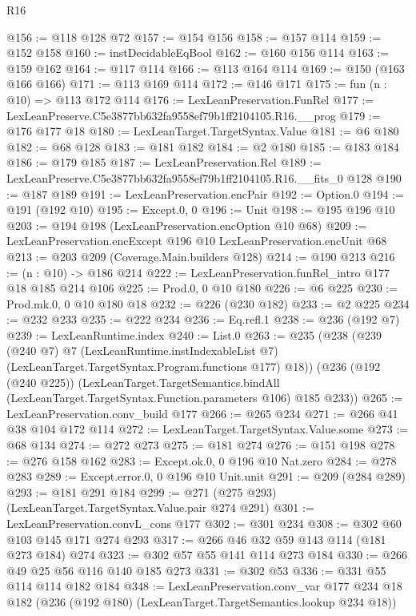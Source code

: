 \begin{lexlean}{R16}
\begin{coremodule}
@156 := @118 @128 @72
@157 := @154 @156
@158 := @157 @114
@159 := @152 @158
@160 := instDecidableEqBool
@162 := @160 @156 @114
@163 := @159 @162
@164 := @117 @114
@166 := @113 @164 @114
@169 := @150 (@163 @166 @166)
@171 := @113 @169 @114
@172 := @146 @171
@175 := fun (n : @10) => @113 @172 @114
@176 := LexLeanPreservation.FunRel
@177 := LexLeanPreserve.C5e3877bb632fa9558ef79b1ff2104105.R16.__prog
@179 := @176 @177 @18
@180 := LexLeanTarget.TargetSyntax.Value
@181 := @6 @180
@182 := @68 @128
@183 := @181 @182
@184 := @2 @180
@185 := @183 @184
@186 := @179 @185
@187 := LexLeanPreservation.Rel
@189 := LexLeanPreserve.C5e3877bb632fa9558ef79b1ff2104105.R16.__fits_0 @128
@190 := @187 @189
@191 := LexLeanPreservation.encPair
@192 := Option.{0}
@194 := @191 (@192 @10)
@195 := Except.{0, 0}
@196 := Unit
@198 := @195 @196 @10
@203 := @194 @198 (LexLeanPreservation.encOption @10 @68)
@209 := LexLeanPreservation.encExcept @196 @10 LexLeanPreservation.encUnit @68
@213 := @203 @209 (Coverage.Main.builders @128)
@214 := @190 @213
@216 := (n : @10) -> @186 @214
@222 := LexLeanPreservation.funRel_intro @177 @18 @185 @214 @106
@225 := Prod.{0, 0} @10 @180
@226 := @6 @225
@230 := Prod.mk.{0, 0} @10 @180 @18
@232 := @226 (@230 @182)
@233 := @2 @225
@234 := @232 @233
@235 := @222 @234
@236 := Eq.refl.{1}
@238 := @236 (@192 @7)
@239 := LexLeanRuntime.index
@240 := List.{0}
@263 := @235
    (@238
      (@239
        (@240 @7)
        @7
        (LexLeanRuntime.instIndexableList @7)
        (LexLeanTarget.TargetSyntax.Program.functions @177)
        @18))
    (@236
      (@192 (@240 @225))
      (LexLeanTarget.TargetSemantics.bindAll
        (LexLeanTarget.TargetSyntax.Function.parameters @106)
        @185
        @233))
@265 := LexLeanPreservation.conv_build @177
@266 := @265 @234
@271 := @266 @41 @38 @104 @172 @114
@272 := LexLeanTarget.TargetSyntax.Value.some
@273 := @68 @134
@274 := @272 @273
@275 := @181 @274
@276 := @151 @198
@278 := @276 @158 @162
@283 := Except.ok.{0, 0} @196 @10 Nat.zero
@284 := @278 @283
@289 := Except.error.{0, 0} @196 @10 Unit.unit
@291 := @209 (@284 @289)
@293 := @181 @291 @184
@299 := @271 (@275 @293) (LexLeanTarget.TargetSyntax.Value.pair @274 @291)
@301 := LexLeanPreservation.convL_cons @177
@302 := @301 @234
@308 := @302 @60 @103 @145 @171 @274 @293
@317 := @266 @46 @32 @59 @143 @114 (@181 @273 @184) @274
@323 := @302 @57 @55 @141 @114 @273 @184
@330 := @266 @49 @25 @56 @116 @140 @185 @273
@331 := @302 @53
@336 := @331 @55 @114 @114 @182 @184
@348 := LexLeanPreservation.conv_var
    @177
    @234
    @18
    @182
    (@236 (@192 @180) (LexLeanTarget.TargetSemantics.lookup @234 @18))

\end{coremodule}
\end{lexlean}
